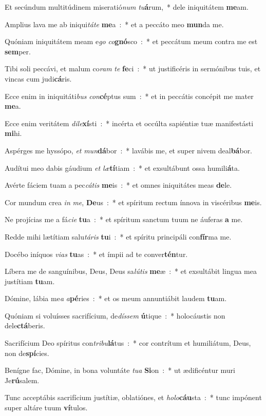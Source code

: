 ﻿\item Et secúndum multitúdinem miseratió\emph{num} \emph{tu}\textbf{á}rum,~* dele iniquitátem \textbf{me}am.
\item Amplius lava me ab iniqui\emph{tá}\emph{te} \textbf{me}a~:~* et a peccáto meo \textbf{mun}da me.\ifx\lalinebreakafterthree\undefined\else\\\fi
\item Quóniam iniquitátem meam e\emph{go} \emph{co}\textbf{gnó}sco~:~* et peccátum meum contra me est \textbf{sem}per.
\item Tibi soli peccávi, et malum co\emph{ram} \emph{te} \textbf{fe}ci~:~* ut justificéris in sermónibus tuis, et vincas cum judi\textbf{cá}ris.
\item Ecce enim in iniquitáti\emph{bus} \emph{con}\textbf{cé}ptus sum~:~* et in peccátis concépit me mater \textbf{me}a.
\item Ecce enim veritátem \emph{di}\emph{le}\textbf{xí}sti~:~* incérta et occúlta sapiéntiæ tuæ manifestásti \textbf{mi}hi.
\item Aspérges me hyssópo, \emph{et} \emph{mun}\textbf{dá}bor~:~* lavábis me, et super nivem deal\textbf{bá}bor.
\item Audítui meo dabis gáudium \emph{et} \emph{læ}\textbf{tí}tiam~:~* et exsultábunt ossa humili\textbf{á}ta.
\item Avérte fáciem tuam a pec\emph{cá}\emph{tis} \textbf{me}is~:~* et omnes iniquitátes meas \textbf{de}le.
\item Cor mundum crea \emph{in} \emph{me}, \textbf{De}us~:~* et spíritum rectum ínnova in viscéribus \textbf{me}is.
\item Ne projícias me a fá\emph{ci}\emph{e} \textbf{tu}a~:~* et spíritum sanctum tuum ne áuferas \textbf{a} me.
\item Redde mihi lætítiam salu\emph{tá}\emph{ris} \textbf{tu}i~:~* et spíritu principáli con\textbf{fír}ma me.
\item Docébo iníquos \emph{vi}\emph{as} \textbf{tu}as~:~* et ímpii ad te conver\textbf{tén}tur.
\item Líbera me de sanguínibus, Deus, Deus sa\emph{lú}\emph{tis} \textbf{me}æ~:~* et exsultábit lingua mea justítiam \textbf{tu}am.
\item Dómine, lábia me\emph{a} \emph{a}\textbf{pé}ries~:~* et os meum annuntiábit laudem \textbf{tu}am.
\item Quóniam si voluísses sacrifícium, de\emph{dís}\emph{sem} \textbf{ú}tique~:~* holocáustis non dele\textbf{ctá}beris.
\item Sacrifícium Deo spíritus con\emph{tri}\emph{bu}\textbf{lá}tus~:~* cor contrítum et humiliátum, Deus, non de\textbf{spí}cies.
\item Benígne fac, Dómine, in bona voluntáte \emph{tu}\emph{a} \textbf{Si}on~:~* ut ædificéntur muri Je\textbf{rú}salem.
\item Tunc acceptábis sacrifícium justítiæ, oblatiónes, et \emph{ho}\emph{lo}\textbf{cáu}sta~:~* tunc impónent super altáre tuum \textbf{ví}tulos.